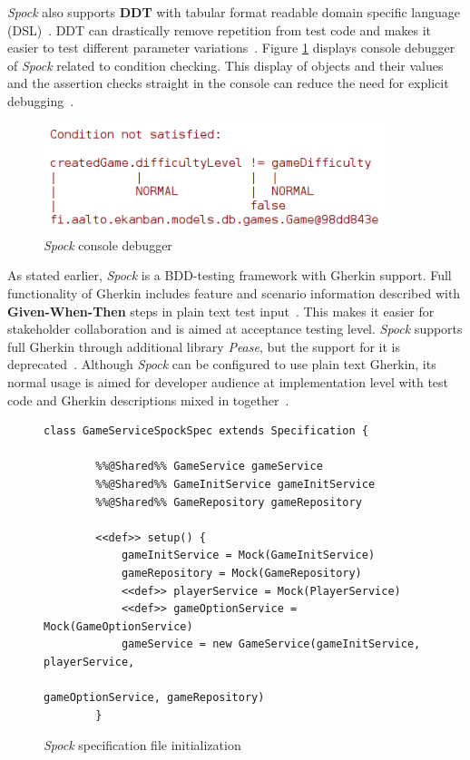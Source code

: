     \textit{Spock} also supports \textbf{DDT} with tabular format readable
    domain specific language (DSL)~\cite{spock}.
    DDT can drastically remove repetition from test code and makes it easier to test different parameter
    variations~\cite{kapelonis2016java}.
    Figure \ref{fig:spock-debug} displays console debugger of \textit{Spock} related to
    condition checking. This display of objects and their values and the assertion checks straight in the console
    can reduce the need for explicit debugging~\cite{kapelonis2016java}.
    \begin{figure}[ht]
      \begin{center}
        \begin{topbot}[style=mdstyle]
        \includegraphics[width=10cm]{images/spock-debug.png}
        \end{topbot}
        \caption{\textit{Spock} console debugger}
        \label{fig:spock-debug}
      \end{center}
    \end{figure}

    As stated earlier, \textit{Spock} is a BDD-testing framework with Gherkin support.
    Full functionality of Gherkin includes feature and scenario information described
    with \textbf{Given-When-Then} steps in plain text test input~\cite{gherkin}. This makes it easier for stakeholder collaboration
    and is aimed at acceptance testing level.
    \textit{Spock} supports full Gherkin through additional library \textit{Pease}, but the support for it is deprecated~\cite{spock-pease}.
    Although \textit{Spock} can be configured to use plain text Gherkin, its normal usage is aimed for developer audience at implementation
    level with test code and Gherkin descriptions mixed in together~\cite{okolnychyi2016study}.

    \begin{figure}[ht]
        \begin{lstlisting}[style=java]
    class GameServiceSpockSpec extends Specification {

        %%@Shared%% GameService gameService
        %%@Shared%% GameInitService gameInitService
        %%@Shared%% GameRepository gameRepository

        <<def>> setup() {
            gameInitService = Mock(GameInitService)
            gameRepository = Mock(GameRepository)
            <<def>> playerService = Mock(PlayerService)
            <<def>> gameOptionService = Mock(GameOptionService)
            gameService = new GameService(gameInitService, playerService,
                                          gameOptionService, gameRepository)
        }
        \end{lstlisting}
        \caption{\textit{Spock} specification file initialization}
        \label{fig:spock-init}
    \end{figure}

